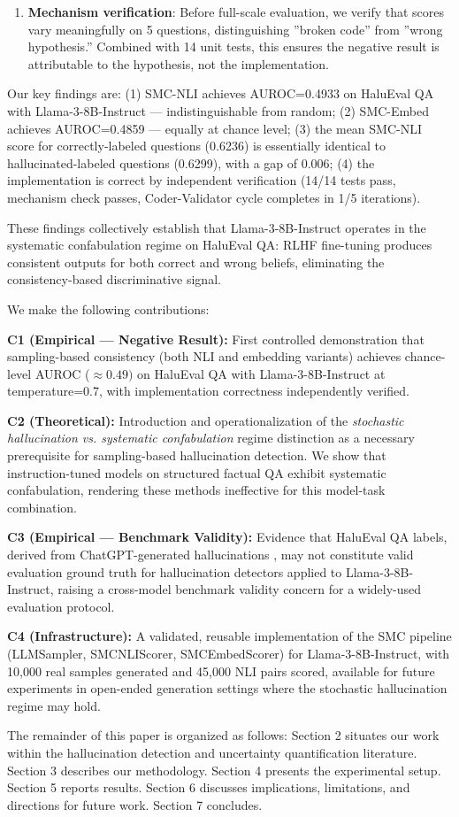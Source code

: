 \begin{enumerate}
\item \textbf{Mechanism verification}: Before full-scale evaluation, we verify that scores vary meaningfully on 5 questions, distinguishing ''broken code'' from ''wrong hypothesis.'' Combined with 14 unit tests, this ensures the negative result is attributable to the hypothesis, not the implementation.
\end{enumerate}

Our key findings are: (1) SMC-NLI achieves AUROC=0.4933 on HaluEval QA with Llama-3-8B-Instruct --- indistinguishable from random; (2) SMC-Embed achieves AUROC=0.4859 --- equally at chance level; (3) the mean SMC-NLI score for correctly-labeled questions (0.6236) is essentially identical to hallucinated-labeled questions (0.6299), with a gap of 0.006; (4) the implementation is correct by independent verification (14/14 tests pass, mechanism check passes, Coder-Validator cycle completes in 1/5 iterations).

These findings collectively establish that Llama-3-8B-Instruct operates in the systematic confabulation regime on HaluEval QA: RLHF fine-tuning produces consistent outputs for both correct and wrong beliefs, eliminating the consistency-based discriminative signal.

We make the following contributions:

\textbf{C1 (Empirical --- Negative Result):} First controlled demonstration that sampling-based consistency (both NLI and embedding variants) achieves chance-level AUROC ($\approx 0.49)$ on HaluEval QA with Llama-3-8B-Instruct at temperature=0.7, with implementation correctness independently verified.

\textbf{C2 (Theoretical):} Introduction and operationalization of the \textit{stochastic hallucination vs. systematic confabulation} regime distinction as a necessary prerequisite for sampling-based hallucination detection. We show that instruction-tuned models on structured factual QA exhibit systematic confabulation, rendering these methods ineffective for this model-task combination.

\textbf{C3 (Empirical --- Benchmark Validity):} Evidence that HaluEval QA labels, derived from ChatGPT-generated hallucinations \citep{Li2023HaluEval}, may not constitute valid evaluation ground truth for hallucination detectors applied to Llama-3-8B-Instruct, raising a cross-model benchmark validity concern for a widely-used evaluation protocol.

\textbf{C4 (Infrastructure):} A validated, reusable implementation of the SMC pipeline (LLMSampler, SMCNLIScorer, SMCEmbedScorer) for Llama-3-8B-Instruct, with 10,000 real samples generated and 45,000 NLI pairs scored, available for future experiments in open-ended generation settings where the stochastic hallucination regime may hold.

The remainder of this paper is organized as follows: Section 2 situates our work within the hallucination detection and uncertainty quantification literature. Section 3 describes our methodology. Section 4 presents the experimental setup. Section 5 reports results. Section 6 discusses implications, limitations, and directions for future work. Section 7 concludes.

